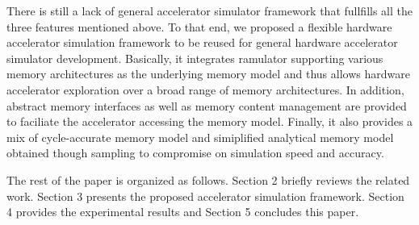 There is still a lack of general accelerator simulator framework that fullfills 
all the three features mentioned above. To that end, we proposed a flexible hardware accelerator 
simulation framework to be reused for general hardware accelerator simulator development. Basically, it 
integrates ramulator supporting various memory architectures as the underlying memory model and thus allows 
hardware accelerator exploration over a broad range of memory architectures. In addition, abstract memory 
interfaces as well as memory content management are provided to faciliate the accelerator accessing 
the memory model. Finally, it also provides a mix of cycle-accurate memory model and simiplified 
analytical memory model obtained though sampling to compromise on simulation speed and accuracy.

The rest of the paper is organized as follows. Section 2 briefly reviews the related work. 
Section 3 presents the proposed accelerator simulation framework. Section 4 provides the 
experimental results and Section 5 concludes this paper.





